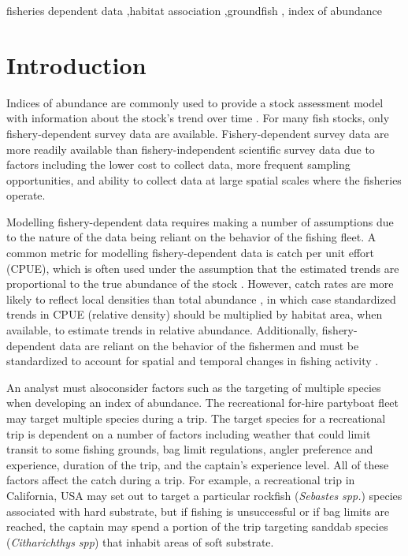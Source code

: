 \documentclass[
  12pt,
  authoryear,
  preprint,
  3p]{elsarticle}
\begin{document}
\begin{frontmatter}
\begin{keyword}
    fisheries dependent data \sep habitat
association \sep groundfish \sep 
    index of abundance
\end{keyword}
\end{frontmatter}\ifdefined\Shaded\renewenvironment{Shaded}{\begin{tcolorbox}[breakable, frame hidden, enhanced, interior hidden, boxrule=0pt, sharp corners, borderline west={3pt}{0pt}{shadecolor}]}{\end{tcolorbox}}\fi

\hypertarget{introduction}{%
\section{Introduction}\label{introduction}}

Indices of abundance are commonly used to provide a stock assessment
model with information about the stock's trend over time
\citep{Harley:2001:CUE, Hilborn:1992:QFS}. For many fish stocks, only
fishery-dependent survey data are available. Fishery-dependent survey
data are more readily available than fishery-independent scientific
survey data due to factors including the lower cost to collect data,
more frequent sampling opportunities, and ability to collect data at
large spatial scales where the fisheries operate.

Modelling fishery-dependent data requires making a number of assumptions
due to the nature of the data being reliant on the behavior of the
fishing fleet. A common metric for modelling fishery-dependent data is
catch per unit effort (CPUE), which is often used under the assumption
that the estimated trends are proportional to the true abundance of the
stock \citep{Maunder:2004:SCE}. However, catch rates are more likely to
reflect local densities than total abundance
\citep{Haggarty:2006:CIR, Schnute:1995:IEP}, in which case standardized
trends in CPUE (relative density) should be multiplied by habitat area,
when available, to estimate trends in relative abundance. Additionally,
fishery-dependent data are reliant on the behavior of the fishermen and
must be standardized to account for spatial and temporal changes in
fishing activity \citep{Campbell:2004:CSA, Hilborn:1992:QFS}.

An analyst must alsoconsider factors such as the targeting of multiple
species when developing an index of abundance. The recreational for-hire
partyboat fleet may target multiple species during a trip. The target
species for a recreational trip is dependent on a number of factors
including weather that could limit transit to some fishing grounds, bag
limit regulations, angler preference and experience, duration of the
trip, and the captain's experience level. All of these factors affect
the catch during a trip. For example, a recreational trip in California,
USA may set out to target a particular rockfish (\emph{Sebastes spp.})
species associated with hard substrate, but if fishing is unsuccessful
or if bag limits are reached, the captain may spend a portion of the
trip targeting sanddab species (\emph{Citharichthys spp}) that inhabit
areas of soft substrate.
\end{document}
